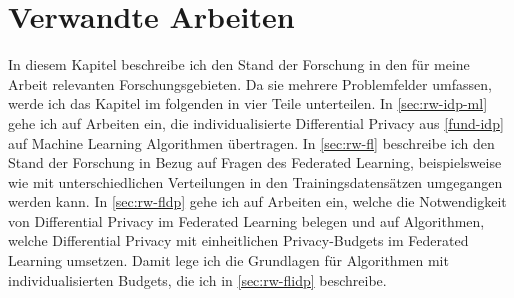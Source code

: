 \chapter{Verwandte Arbeiten}\label{chap:related-work}


In diesem Kapitel beschreibe ich den Stand der Forschung in den für meine Arbeit relevanten Forschungsgebieten. Da sie mehrere Problemfelder umfassen, werde ich das Kapitel im folgenden in vier Teile unterteilen. In \autoref{sec:rw-idp-ml} gehe ich auf Arbeiten ein, die individualisierte Differential Privacy aus \autoref{fund-idp} auf Machine Learning Algorithmen übertragen. In \autoref{sec:rw-fl} beschreibe ich den Stand der Forschung in Bezug auf Fragen des Federated Learning, beispielsweise wie mit unterschiedlichen Verteilungen in den Trainingsdatensätzen umgegangen werden kann. In \autoref{sec:rw-fldp} gehe ich auf Arbeiten ein, welche die Notwendigkeit von Differential Privacy im Federated Learning belegen und auf Algorithmen, welche Differential Privacy mit einheitlichen Privacy-Budgets im Federated Learning umsetzen. Damit lege ich die Grundlagen für Algorithmen mit individualisierten Budgets, die ich in \autoref{sec:rw-flidp} beschreibe.

